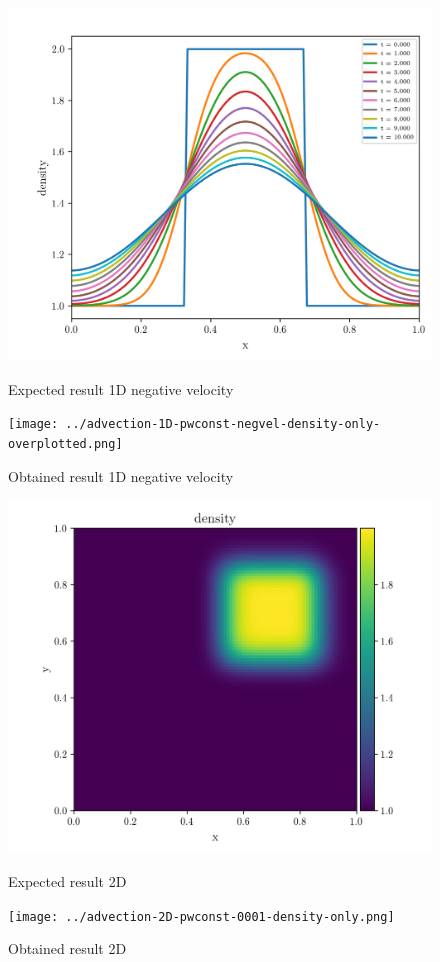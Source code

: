 \begin{figure}[htbp]
    \centering
	\includegraphics[width=.7\textwidth]{./figures/advection-1D-pwconst-negvel-density-only-overplotted.png}%
	\caption{Expected result 1D negative velocity}
	\texttt{[image: ../advection-1D-pwconst-negvel-density-only-overplotted.png]}%
	\caption{Obtained result 1D negative velocity}
\end{figure}

\begin{figure}[htbp]
    \centering
	\includegraphics[width=.7\textwidth]{./figures/advection-2D-pwconst-0001-density-only.png}%
	\caption{Expected result 2D}
	\texttt{[image: ../advection-2D-pwconst-0001-density-only.png]}%
	\caption{Obtained result 2D}
\end{figure}

